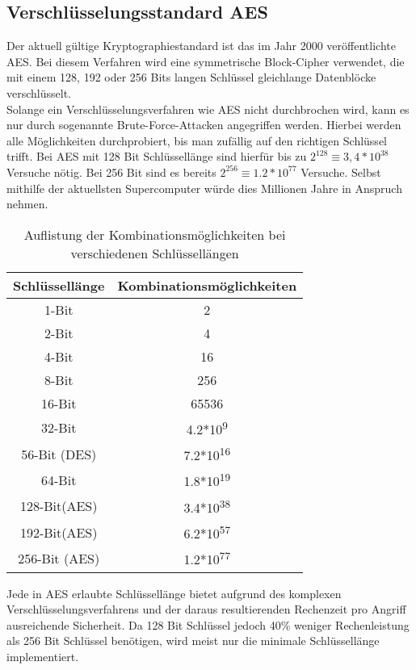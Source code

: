 \subsection{Verschlüsselungsstandard AES}\label{ss:AES}

Der aktuell gültige Kryptographiestandard ist das im Jahr 2000 veröffentlichte \ac{AES}. Bei diesem Verfahren wird eine symmetrische Block-Cipher verwendet, die mit einem 128, 192 oder 256 Bits langen Schlüssel gleichlange Datenblöcke verschlüsselt\cite{ws:AES}.\\
Solange ein Verschlüsselungsverfahren wie \ac{AES} nicht durchbrochen wird, kann es nur durch sogenannte Brute-Force-Attacken angegriffen werden. Hierbei werden alle Möglichkeiten durchprobiert, bis man zufällig auf den richtigen Schlüssel trifft. Bei \ac{AES} mit 128 Bit Schlüssellänge sind hierfür bis zu $2^{128}\equiv 3,4*10^{38}$ Versuche nötig. Bei 256 Bit sind es bereits $2^{256}\equiv 1.2*10^{77}$ Versuche. Selbst mithilfe der aktuellsten Supercomputer würde dies Millionen Jahre in Anspruch nehmen.\\

\begin{table}[H] 
	\centering
	\begin{tabular}{|c|c|}\hline
		Schlüssellänge & Kombinationsmöglichkeiten\\ \hline \hline
		1-Bit & 2 \\ \hline
		2-Bit & 4 \\ \hline
		4-Bit & 16 \\ \hline
		8-Bit & 256 \\ \hline
		16-Bit & 65536 \\ \hline
		32-Bit & 4.2*10\textsuperscript{9} \\ \hline
		56-Bit (DES) & 7.2*10\textsuperscript{16} \\ \hline
		64-Bit  & 1.8*10\textsuperscript{19} \\ \hline
		128-Bit(AES) & 3.4*10\textsuperscript{38} \\ \hline
		192-Bit(AES) & 6.2*10\textsuperscript{57} \\ \hline
		256-Bit (AES) &  1.2*10\textsuperscript{77} \\ \hline
	\end{tabular}
	\caption{Auflistung der Kombinationsmöglichkeiten bei verschiedenen Schlüssellängen}
	\label{t:keylength}
\end{table}
\vspace{5 mm}

Jede in \ac{AES} erlaubte Schlüssellänge bietet aufgrund des komplexen Verschlüsselungsverfahrens und der daraus resultierenden Rechenzeit pro Angriff ausreichende Sicherheit. Da 128 Bit Schlüssel jedoch 40\% weniger Rechenleistung als 256 Bit Schlüssel benötigen, wird meist nur die minimale Schlüssellänge implementiert. 